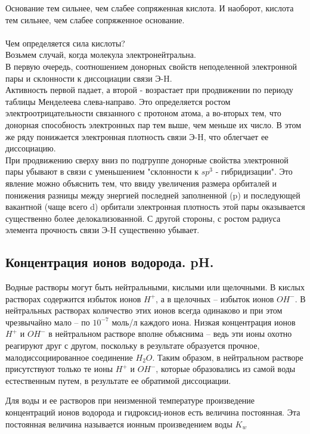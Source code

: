 \documentclass[14pt,a4paper]{scrartcl}
\begin{document}
Основание тем сильнее, чем слабее сопряженная кислота. И наоборот, кислота тем сильнее, чем слабее сопряженное основание. \\\\
Чем определяется сила кислоты? \\
Возьмем случай, когда молекула электронейтральна. \\
В первую очередь, соотношением донорных свойств неподеленной электронной пары и склонности к диссоциации связи Э-H. \\
Активность первой падает, а второй - возрастает при продвижении по периоду таблицы Менделеева слева-направо. Это определяется ростом электроотрицательности связанного с протоном атома, а во-вторых тем, что донорная способность электронных пар тем выше, чем меньше их число. В этом же ряду понижается электронная плотность связи Э-H, что облегчает ее диссоциацию. \\
При продвижению сверху вниз по подгруппе донорные свойства электронной пары убывают в связи с уменьшением "склонности к $sp^3$ - гибридизации". Это явление можно объяснить тем, что ввиду увеличения размера орбиталей и понижения разницы между энергией последней заполненной (p) и последующей вакантной (чаще всего d) орбитали электронная плотность этой пары оказывается существенно более делокализованной. С другой стороны, с ростом радиуса элемента прочность связи Э-H существенно убывает.

\subsection*{Концентрация ионов водорода. pH.}

Водные растворы могут быть нейтральными, кислыми или щелочными. В кислых растворах содержится избыток ионов $H^+$, а в щелочных – избыток ионов $OH^-$. В нейтральных растворах количество этих ионов всегда одинаково и при этом чрезвычайно мало – по $10^{-7}$ моль/л каждого иона. Низкая концентрация ионов $H^+$ и $OH^-$ в нейтральном растворе вполне объяснима – ведь эти ионы охотно реагируют друг с другом, поскольку в результате образуется прочное, малодиссоциированное соединение $H_2O$. Таким образом, в нейтральном растворе присутствуют только те ионы $H^+$ и $OH^-$, которые образовались из самой воды естественным путем, в результате ее обратимой диссоциации.

Для воды и ее растворов при неизменной температуре произведение концентраций ионов водорода и гидроксид-ионов есть величина постоянная. Эта постоянная величина называется ионным произведением воды $K_w$
\end{document}

